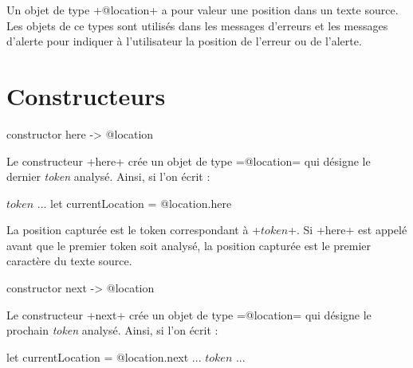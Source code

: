 



Un objet de type \ggsq+@location+ a pour valeur une position dans un texte source. Les objets de ce types sont utilisés dans les messages d'erreurs et les messages d'alerte pour indiquer à l'utilisateur la position de l'erreur ou de l'alerte.











\section{Constructeurs}



\begin{galgas4}
constructor here -> @location
\end{galgas4}

Le constructeur \ggsq+here+ crée un objet de type \ggsq=@location= qui désigne le dernier \emph{token} analysé. Ainsi, si l'on écrit :

\begin{galgas4}
  $token$
  ...
  let currentLocation = @location.here
\end{galgas4}

La position capturée est le token correspondant à \ggsq+$token$+. Si \ggsq+here+ est appelé avant que le premier token soit analysé, la position capturée est le premier caractère du texte source.







\begin{galgas4}
constructor next -> @location
\end{galgas4}

Le constructeur \ggsq+next+ crée un objet de type \ggsq=@location= qui désigne le prochain \emph{token} analysé. Ainsi, si l'on écrit :

\begin{galgas4}
  let currentLocation = @location.next
  ...
  $token$
  ...
\end{galgas4}

